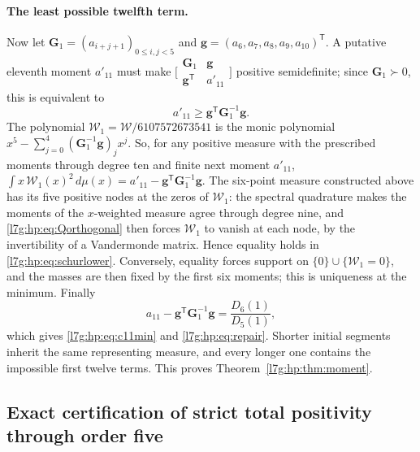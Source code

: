 \documentclass[11pt,letterpaper]{article}
\theoremstyle{remark}\newtheorem{remark}[theorem]{Remark}
\newcounter{l7gtrsavedeq}
\begin{document}
\paragraph{The least possible twelfth term.}
Now let $\mathbf G_1=(a_{i+j+1})_{0\le i,j<5}$ and
$\mathbf g=(a_6,a_7,a_8,a_9,a_{10})^{\mathsf T}$. A putative eleventh
moment $a'_{11}$ must make
$\bigl[\begin{smallmatrix}\mathbf G_1&\mathbf g\\\mathbf g^{\mathsf T}&a'_{11}\end{smallmatrix}\bigr]$
positive semidefinite; since $\mathbf G_1\succ0$, this is equivalent to
\begin{equation}\label{l7g:hp:eq:schurlower}
 a'_{11}\ge\mathbf g^{\mathsf T}\mathbf G_1^{-1}\mathbf g.
\end{equation}
The polynomial $\mathcal W_1=\mathcal W/6107572673541$ is the monic
polynomial $x^5-\sum_{j=0}^4(\mathbf G_1^{-1}\mathbf g)_jx^j$. So, for any
positive measure with the prescribed moments through degree ten and finite
next moment $a'_{11}$,
$\int x\,\mathcal W_1(x)^2\,d\mu(x)=a'_{11}-\mathbf g^{\mathsf T}\mathbf
G_1^{-1}\mathbf g$. The six-point measure constructed above has its five
positive nodes at the zeros of $\mathcal W_1$: the spectral quadrature makes
the moments of the $x$-weighted measure agree through degree nine, and
\eqref{l7g:hp:eq:Qorthogonal} then forces $\mathcal W_1$ to vanish at each
node, by the invertibility of a Vandermonde matrix. Hence equality holds in
\eqref{l7g:hp:eq:schurlower}. Conversely, equality forces support on
$\{0\}\cup\{\mathcal W_1=0\}$, and the masses are then fixed by the first six
moments; this is uniqueness at the minimum. Finally
\[
 a_{11}-\mathbf g^{\mathsf T}\mathbf G_1^{-1}\mathbf g=\frac{D_6(1)}{D_5(1)},
\]
which gives \eqref{l7g:hp:eq:c11min} and \eqref{l7g:hp:eq:repair}. Shorter
initial segments inherit the same representing measure, and every longer one
contains the impossible first twelve terms. This proves
Theorem~\ref{l7g:hp:thm:moment}.

\subsection{Exact certification of strict total positivity through order five}\label{l7g:hp:sec:certificate}
\end{document}
